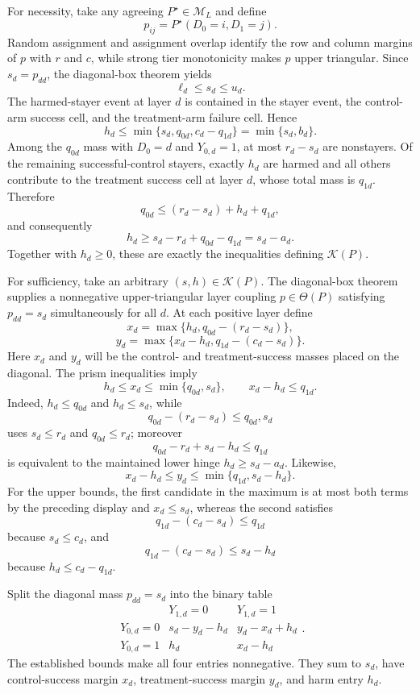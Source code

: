 For necessity, take any agreeing \(P^{\star}\in\mathcal M_L\) and define
\[
 p_{ij}=P^{\star}(D_0=i,D_1=j).
\]
Random assignment and assignment overlap identify the row and column margins of \(p\) with \(r\) and \(c\), while strong tier monotonicity makes \(p\) upper triangular.  Since \(s_d=p_{dd}\), the diagonal-box theorem yields
\[
 \ell_d\le s_d\le u_d.
\]
The harmed-stayer event at layer \(d\) is contained in the stayer event, the control-arm success cell, and the treatment-arm failure cell.  Hence
\[
 h_d\le \min\{s_d,q_{0d},c_d-q_{1d}\}
 =\min\{s_d,b_d\}.
\]
Among the \(q_{0d}\) mass with \(D_0=d\) and \(Y_{0,d}=1\), at most \(r_d-s_d\) are nonstayers.  Of the remaining successful-control stayers, exactly \(h_d\) are harmed and all others contribute to the treatment success cell at layer \(d\), whose total mass is \(q_{1d}\).  Therefore
\[
 q_{0d}\le(r_d-s_d)+h_d+q_{1d},
\]
and consequently
\[
 h_d\ge s_d-r_d+q_{0d}-q_{1d}=s_d-a_d.
\]
Together with \(h_d\ge0\), these are exactly the inequalities defining \(\mathcal K(P)\).

For sufficiency, take an arbitrary \((s,h)\in\mathcal K(P)\).  The diagonal-box theorem supplies a nonnegative upper-triangular layer coupling \(p\in\Theta(P)\) satisfying \(p_{dd}=s_d\) simultaneously for all \(d\).  At each positive layer define
\[
 x_d=\max\{h_d,q_{0d}-(r_d-s_d)\},
\]
\[
 y_d=\max\{x_d-h_d,q_{1d}-(c_d-s_d)\}.
\]
Here \(x_d\) and \(y_d\) will be the control- and treatment-success masses placed on the diagonal.  The prism inequalities imply
\[
 h_d\le x_d\le\min\{q_{0d},s_d\},
 \qquad
 x_d-h_d\le q_{1d}.
\]
Indeed, \(h_d\le q_{0d}\) and \(h_d\le s_d\), while
\[
 q_{0d}-(r_d-s_d)\le q_{0d},s_d
\]
uses \(s_d\le r_d\) and \(q_{0d}\le r_d\); moreover
\[
 q_{0d}-r_d+s_d-h_d\le q_{1d}
\]
is equivalent to the maintained lower hinge \(h_d\ge s_d-a_d\).  Likewise,
\[
 x_d-h_d\le y_d\le\min\{q_{1d},s_d-h_d\}.
\]
For the upper bounds, the first candidate in the maximum is at most both terms by the preceding display and \(x_d\le s_d\), whereas the second satisfies
\[
 q_{1d}-(c_d-s_d)\le q_{1d}
\]
because \(s_d\le c_d\), and
\[
 q_{1d}-(c_d-s_d)\le s_d-h_d
\]
because \(h_d\le c_d-q_{1d}\).

Split the diagonal mass \(p_{dd}=s_d\) into the binary table
\[
\begin{array}{c|cc}
 &Y_{1,d}=0&Y_{1,d}=1\\ \hline
Y_{0,d}=0&s_d-y_d-h_d&y_d-x_d+h_d\\
Y_{0,d}=1&h_d&x_d-h_d
\end{array}.
\]
The established bounds make all four entries nonnegative.  They sum to \(s_d\), have control-success margin \(x_d\), treatment-success margin \(y_d\), and harm entry \(h_d\).

